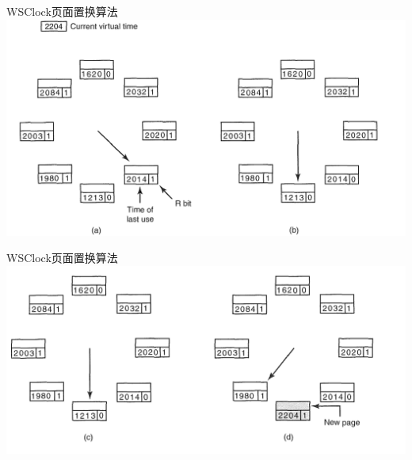 \documentclass[xcolor=svgnames]{beamer}
\begin{document}
\begin{CJK*}{UTF8}{gbsn}
\begin{frame}{WSClock页面置换算法}
\includegraphics[width=1.0\textwidth]{wsclock1.png}
\end{frame}

\begin{frame}{WSClock页面置换算法}
\includegraphics[width=1.0\textwidth]{wsclock2.png}
\end{frame}

%


\end{CJK*}
\end{document}
